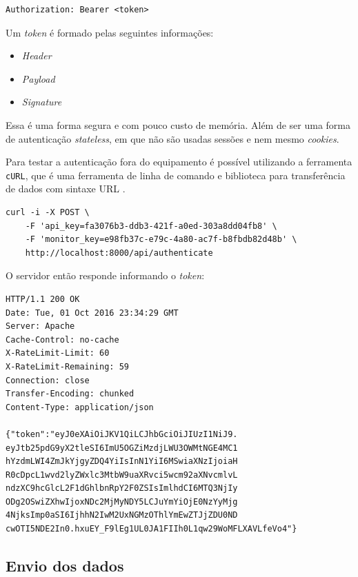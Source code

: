 \begin{verbatim}
Authorization: Bearer <token>
\end{verbatim}

Um \emph{token} é formado pelas seguintes informações:

\begin{itemize}
\itemsep1pt\parskip0pt
\item
  \emph{Header}
\item
  \emph{Payload}
\item
  \emph{Signature}
\end{itemize}

Essa é uma forma segura e com pouco custo de memória. Além de ser uma
forma de autenticação \emph{stateless}, em que não são usadas sessões e
nem mesmo \emph{cookies}.

Para testar a autenticação fora do equipamento \iot é possível
utilizando a ferramenta \texttt{cURL}, que é uma ferramenta de linha de
comando e biblioteca para transferência de dados com sintaxe URL
\cite{curl:1996}.

\begin{verbatim}
curl -i -X POST \
    -F 'api_key=fa3076b3-ddb3-421f-a0ed-303a8dd04fb8' \
    -F 'monitor_key=e98fb37c-e79c-4a80-ac7f-b8fbdb82d48b' \
    http://localhost:8000/api/authenticate
\end{verbatim}

O servidor então responde informando o \emph{token}:

\begin{verbatim}
HTTP/1.1 200 OK
Date: Tue, 01 Oct 2016 23:34:29 GMT
Server: Apache
Cache-Control: no-cache
X-RateLimit-Limit: 60
X-RateLimit-Remaining: 59
Connection: close
Transfer-Encoding: chunked
Content-Type: application/json

{"token":"eyJ0eXAiOiJKV1QiLCJhbGciOiJIUzI1NiJ9.
eyJtb25pdG9yX2tleSI6ImU5OGZiMzdjLWU3OWMtNGE4MC1
hYzdmLWI4ZmJkYjgyZDQ4YiIsInN1YiI6MSwiaXNzIjoiaH
R0cDpcL1wvd2lyZWxlc3MtbW9uaXRvci5wcm92aXNvcmlvL
ndzXC9hcGlcL2F1dGhlbnRpY2F0ZSIsImlhdCI6MTQ3NjIy
ODg2OSwiZXhwIjoxNDc2MjMyNDY5LCJuYmYiOjE0NzYyMjg
4NjksImp0aSI6IjhhN2IwM2UxNGMzOThlYmEwZTJjZDU0ND
cwOTI5NDE2In0.hxuEY_F9lEg1UL0JA1FIIh0L1qw29WoMFLXAVLfeVo4"}
\end{verbatim}

\subsection{Envio dos dados}\label{envio-dos-dados}

